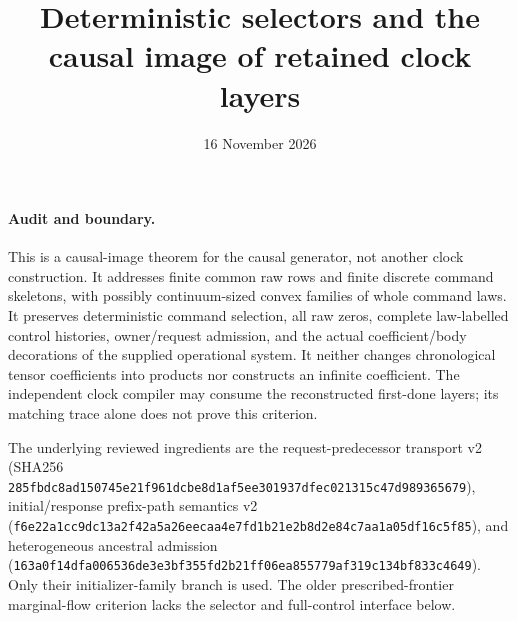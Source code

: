 \documentclass[11pt]{article}
\title{Deterministic selectors and the causal image of retained clock layers}
\date{16 November 2026}
\begin{document}
\maketitle
\paragraph{Audit and boundary.}
This is a causal-image theorem for the causal generator, not another clock construction. It addresses finite common raw rows and finite discrete command skeletons, with possibly continuum-sized convex families of whole command laws. It preserves deterministic command selection, all raw zeros, complete law-labelled control histories, owner/request admission, and the actual coefficient/body decorations of the supplied operational system. It neither changes chronological tensor coefficients into products nor constructs an infinite coefficient. The independent clock compiler may consume the reconstructed first-done layers; its matching trace alone does not prove this criterion.

The underlying reviewed ingredients are the request-predecessor transport v2 (SHA256 \texttt{285fbdc8ad150745e21f961dcbe8d1af5ee301937dfec021315c47d989365679}), initial/response prefix-path semantics v2 (\texttt{f6e22a1cc9dc13a2f42a5a26eecaa4e7fd1b21e2b8d2e84c7aa1a05df16c5f85}), and heterogeneous ancestral admission (\texttt{163a0f14dfa006536de3e3bf355fd2b21ff06ea855779af319c134bf833c4649}). Only their initializer-family branch is used. The older prescribed-frontier marginal-flow criterion lacks the selector and full-control interface below.
\end{document}
